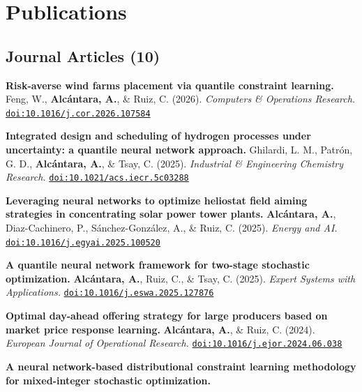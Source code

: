 \documentclass[10pt,a4paper]{article}
\begin{document}
\section*{Publications}

\subsection*{Journal Articles (10)}
\begin{enumerate}[label={[\arabic*]}, series=publist, leftmargin=2.1em,
                  itemsep=5pt, topsep=3pt, parsep=0pt]
\item \textbf{Risk-averse wind farms placement via quantile constraint learning.}\newline
      Feng, W., \textbf{Alc\'antara, A.}, \& Ruiz, C. (2026). \textit{Computers \& Operations Research.} \href{https://doi.org/10.1016/j.cor.2026.107584}{\nolinkurl{doi:10.1016/j.cor.2026.107584}}
\item \textbf{Integrated design and scheduling of hydrogen processes under uncertainty: a quantile neural network approach.}\newline
      Ghilardi, L. M., Patr\'on, G. D., \textbf{Alc\'antara, A.}, \& Tsay, C. (2025). \textit{Industrial \& Engineering Chemistry Research.} \href{https://doi.org/10.1021/acs.iecr.5c03288}{\nolinkurl{doi:10.1021/acs.iecr.5c03288}}\item \textbf{Leveraging neural networks to optimize heliostat field aiming strategies in concentrating solar power tower plants.}\newline
      \textbf{Alc\'antara, A.}, Diaz-Cachinero, P., S\'anchez-Gonz\'alez, A., \& Ruiz, C. (2025). \textit{Energy and AI.} \href{https://doi.org/10.1016/j.egyai.2025.100520}{\nolinkurl{doi:10.1016/j.egyai.2025.100520}}\item \textbf{A quantile neural network framework for two-stage stochastic optimization.}\newline
      \textbf{Alc\'antara, A.}, Ruiz, C., \& Tsay, C. (2025). \textit{Expert Systems with Applications.} \href{https://doi.org/10.1016/j.eswa.2025.127876}{\nolinkurl{doi:10.1016/j.eswa.2025.127876}}\item \textbf{Optimal day-ahead offering strategy for large producers based on market price response learning.}\newline
      \textbf{Alc\'antara, A.}, \& Ruiz, C. (2024). \textit{European Journal of Operational Research.} \href{https://doi.org/10.1016/j.ejor.2024.06.038}{\nolinkurl{doi:10.1016/j.ejor.2024.06.038}}\item \textbf{A neural network-based distributional constraint learning methodology for mixed-integer stochastic optimization.}\newline

\end{enumerate}
\end{document}
